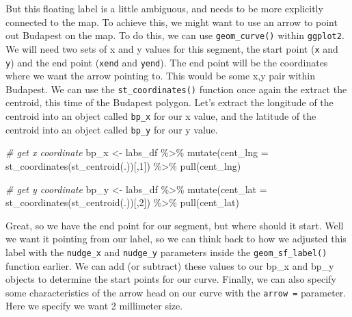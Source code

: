 \documentclass[
]{book}
\makeatletter
\newenvironment{Shaded}{\begin{snugshade}}{\end{snugshade}}
\newcommand{\AttributeTok}[1]{\textcolor[rgb]{0.61,0.61,0.61}{#1}}
\newcommand{\CommentTok}[1]{\textcolor[rgb]{0.37,0.37,0.37}{\textit{#1}}}
\newcommand{\DecValTok}[1]{\textcolor[rgb]{0.06,0.06,0.06}{#1}}
\newcommand{\FunctionTok}[1]{\textcolor[rgb]{0,0,0}{#1}}
\newcommand{\NormalTok}[1]{#1}
\newcommand{\OtherTok}[1]{\textcolor[rgb]{0.37,0.37,0.37}{#1}}
\newcommand{\SpecialCharTok}[1]{\textcolor[rgb]{0,0,0}{#1}}
\newenvironment{kframe}{%
\medskip{}
\setlength{\fboxsep}{.8em}
 \def\at@end@of@kframe{}%
 \ifinner\ifhmode%
  \def\at@end@of@kframe{\end{minipage}}%
  \begin{minipage}{\columnwidth}%
 \fi\fi%
 \def\FrameCommand##1{\hskip\@totalleftmargin \hskip-\fboxsep
 \colorbox{shadecolor}{##1}\hskip-\fboxsep
     \hskip-\linewidth \hskip-\@totalleftmargin \hskip\columnwidth}%
 \MakeFramed {\advance\hsize-\width
   \@totalleftmargin\z@ \linewidth\hsize
   \@setminipage}}%
 {\par\unskip\endMakeFramed%
 \at@end@of@kframe}
\renewenvironment{Shaded}{\begin{kframe}}{\end{kframe}}
\makeatother
\begin{document}
But this floating label is a little ambiguous, and needs to be more explicitly connected to the map. To achieve this, we might want to use an arrow to point out Budapest on the map. To do this, we can use \texttt{geom\_curve()} within \texttt{ggplot2}. We will need two sets of x and y values for this segment, the start point (\texttt{x} and \texttt{y}) and the end point (\texttt{xend} and \texttt{yend}). The end point will be the coordinates where we want the arrow pointing to. This would be some x,y pair within Budapest. We can use the \texttt{st\_coordinates()} function once again the extract the centroid, this time of the Budapest polygon. Let's extract the longitude of the centroid into an object called \texttt{bp\_x} for our x value, and the latitude of the centroid into an object called \texttt{bp\_y} for our y value.

\begin{Shaded}
\begin{Highlighting}[]
\CommentTok{\# get x coordinate}
\NormalTok{bp\_x }\OtherTok{\textless{}{-}}\NormalTok{ labs\_df }\SpecialCharTok{\%\textgreater{}\%} 
  \FunctionTok{mutate}\NormalTok{(}\AttributeTok{cent\_lng =} \FunctionTok{st\_coordinates}\NormalTok{(}\FunctionTok{st\_centroid}\NormalTok{(.))[,}\DecValTok{1}\NormalTok{]) }\SpecialCharTok{\%\textgreater{}\%} 
  \FunctionTok{pull}\NormalTok{(cent\_lng)}

\CommentTok{\# get y coordinate}
\NormalTok{bp\_y }\OtherTok{\textless{}{-}}\NormalTok{ labs\_df }\SpecialCharTok{\%\textgreater{}\%} 
  \FunctionTok{mutate}\NormalTok{(}\AttributeTok{cent\_lat =} \FunctionTok{st\_coordinates}\NormalTok{(}\FunctionTok{st\_centroid}\NormalTok{(.))[,}\DecValTok{2}\NormalTok{]) }\SpecialCharTok{\%\textgreater{}\%} 
  \FunctionTok{pull}\NormalTok{(cent\_lat)}
\end{Highlighting}
\end{Shaded}

Great, so we have the end point for our segment, but where should it start. Well we want it pointing from our label, so we can think back to how we adjusted this label with the \texttt{nudge\_x} and \texttt{nudge\_y} parameters inside the \texttt{geom\_sf\_label()} function earlier. We can add (or subtract) these values to our bp\_x and bp\_y objects to determine the start points for our curve. Finally, we can also specify some characteristics of the arrow head on our curve with the \texttt{arrow\ =} parameter. Here we specify we want 2 millimeter size.
\end{document}

